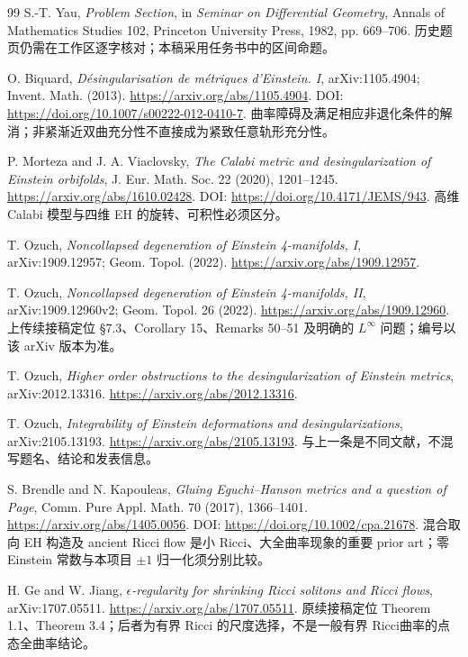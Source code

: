 \documentclass[UTF8,a4paper,11pt,fontset=fandol]{ctexart}
\numberwithin{equation}{section}
\theoremstyle{definition}
\begin{document}
\begin{thebibliography}{99}
 S.-T. Yau, \emph{Problem Section}, in \emph{Seminar on Differential Geometry}, Annals of Mathematics Studies 102, Princeton University Press, 1982, pp. 669--706. 历史题页仍需在工作区逐字核对；本稿采用任务书中的区间命题。

 O. Biquard, \emph{D\'esingularisation de m\'etriques d'Einstein. I}, arXiv:1105.4904; Invent. Math. (2013). \url{https://arxiv.org/abs/1105.4904}. DOI: \url{https://doi.org/10.1007/s00222-012-0410-7}. 曲率障碍及满足相应非退化条件的解消；非紧渐近双曲充分性不直接成为紧致任意轨形充分性。

 P. Morteza and J. A. Viaclovsky, \emph{The Calabi metric and desingularization of Einstein orbifolds}, J. Eur. Math. Soc. 22 (2020), 1201--1245. \url{https://arxiv.org/abs/1610.02428}. DOI: \url{https://doi.org/10.4171/JEMS/943}. 高维 Calabi 模型与四维 EH 的旋转、可积性必须区分。

 T. Ozuch, \emph{Noncollapsed degeneration of Einstein 4-manifolds, I}, arXiv:1909.12957; Geom. Topol. (2022). \url{https://arxiv.org/abs/1909.12957}.

 T. Ozuch, \emph{Noncollapsed degeneration of Einstein 4-manifolds, II}, arXiv:1909.12960v2; Geom. Topol. 26 (2022). \url{https://arxiv.org/abs/1909.12960}. 上传续接稿定位 \S7.3、Corollary 15、Remarks 50--51 及明确的 $L^\infty$ 问题；编号以该 arXiv 版本为准。

 T. Ozuch, \emph{Higher order obstructions to the desingularization of Einstein metrics}, arXiv:2012.13316. \url{https://arxiv.org/abs/2012.13316}.

 T. Ozuch, \emph{Integrability of Einstein deformations and desingularizations}, arXiv:2105.13193. \url{https://arxiv.org/abs/2105.13193}. 与上一条是不同文献，不混写题名、结论和发表信息。

 S. Brendle and N. Kapouleas, \emph{Gluing Eguchi--Hanson metrics and a question of Page}, Comm. Pure Appl. Math. 70 (2017), 1366--1401. \url{https://arxiv.org/abs/1405.0056}. DOI: \url{https://doi.org/10.1002/cpa.21678}. 混合取向 EH 构造及 ancient Ricci flow 是小 Ricci、大全曲率现象的重要 prior art；零 Einstein 常数与本项目 $\pm1$ 归一化须分别比较。

 H. Ge and W. Jiang, \emph{$\epsilon$-regularity for shrinking Ricci solitons and Ricci flows}, arXiv:1707.05511. \url{https://arxiv.org/abs/1707.05511}. 原续接稿定位 Theorem 1.1、Theorem 3.4；后者为有界 Ricci 的尺度选择，不是一般有界 Ricci曲率的点态全曲率结论。


\end{thebibliography}
\end{document}
